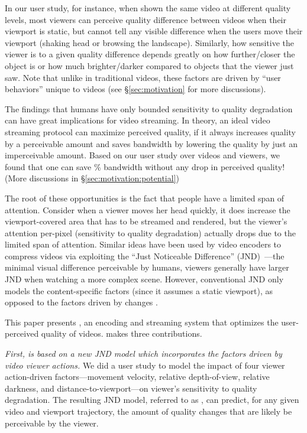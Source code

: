 In our user study, for instance, when shown the same video at different quality levels, most viewers can perceive quality difference between videos when their viewport is static, but cannot tell any visible difference when the users move their viewport (\eg shaking head or browsing the landscape).
Similarly, how sensitive the viewer is to a given quality difference depends greatly on how further/closer the object is or how much brighter/darker compared to objects that the viewer just saw.
Note that unlike in traditional videos, these factors are driven by ``user behaviors'' unique to \vr videos (see \S\ref{sec:motivation} for more discussions).


The findings that humans have only bounded sensitivity to quality degradation can have great implications for \vr video streaming. 
In theory, an ideal video streaming protocol can maximize perceived quality, if it always increases quality by a perceivable amount and saves bandwidth by lowering the quality by just an imperceivable amount. 
Based on our user study over \fillme videos and \fillme viewers, we found that one can save \fillme\% bandwidth without any drop in perceived quality! (More discussions in \S\ref{sec:motivation:potential})


The root of these opportunities is the fact that people have a limited span of attention.
Consider when a viewer moves her head quickly, it does increase the viewport-covered area that has to be streamed and rendered, but the viewer's attention per-pixel (\ie sensitivity to quality degradation) actually drops due to the limited span of attention.
Similar ideas have been used by video encoders to compress videos via exploiting the ``Just Noticeable Difference'' (JND)~\cite{??,??,??}---the minimal visual difference perceivable by humans, \eg viewers generally have larger JND when watching a more complex scene. 
However, conventional JND only models the content-specific factors (since it assumes a static viewport), as opposed to the factors driven by changes . 

This paper presents {\em \name}, an encoding and streaming system that optimizes the user-perceived quality of \vr videos. 
\name makes three contributions.

\vspace{0.2cm}
{\em First, \name is based on a new JND model which incorporates the factors driven by \vr video viewer actions.}
We did a user study to model the impact of four viewer action-driven factors---movement velocity, relative depth-of-view, relative darkness, and distance-to-viewport---on viewer's sensitivity to quality degradation.
The resulting JND model, referred to as {\em \vrjnd}, can predict, for any given video and viewport trajectory, the amount of quality changes  that are likely be perceivable by the viewer.

